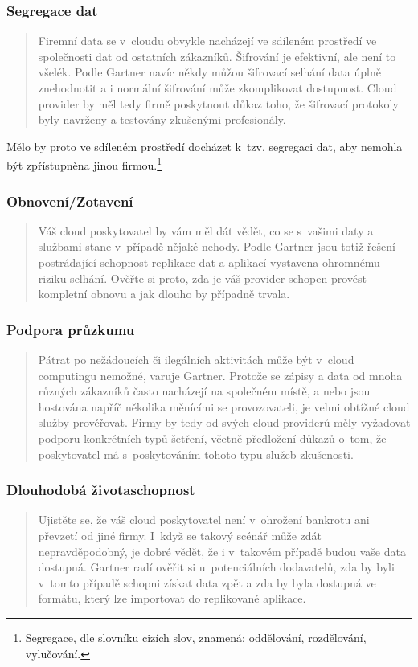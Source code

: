 \subsubsection{Segregace dat}
\begin{quote}
Firemní data se v~cloudu obvykle nacházejí ve sdíleném prostředí ve společnosti dat od ostatních zákazníků. Šifrování je efektivní, ale není to všelék. Podle Gartner navíc někdy můžou šifrovací selhání data úplně znehodnotit a i normální šifrování může zkomplikovat dostupnost. Cloud provider by měl tedy firmě poskytnout důkaz toho, že šifrovací protokoly byly navrženy a testovány zkušenými profesionály.\cite{cloud.cz:7rizik}
\end{quote}
Mělo by proto ve sdíleném prostředí docházet k~tzv. segregaci dat, aby nemohla být zpřístupněna jinou firmou.\footnote{Segregace, dle slovníku cizích slov, znamená: oddělování, rozdělování, vylučování.}

\subsubsection{Obnovení/Zotavení}
\begin{quote}
Váš cloud poskytovatel by vám měl dát vědět, co se s~vašimi daty a službami stane v~případě nějaké nehody. Podle Gartner jsou totiž řešení postrádající schopnost replikace dat a aplikací vystavena ohromnému riziku selhání. Ověřte si proto, zda je váš provider schopen provést kompletní obnovu a jak dlouho by případně trvala.\cite{cloud.cz:7rizik}
\end{quote}

\subsubsection{Podpora průzkumu}
\begin{quote}
Pátrat po nežádoucích či ilegálních aktivitách může být v~cloud computingu nemožné, varuje Gartner. Protože se zápisy a data od mnoha různých zákazníků často nacházejí na společném místě, a nebo jsou hostována napříč několika měnícími se provozovateli, je velmi obtížné cloud služby prověřovat. Firmy by tedy od svých cloud providerů měly vyžadovat podporu konkrétních typů šetření, včetně předložení důkazů o~tom, že poskytovatel má s~poskytováním tohoto typu služeb zkušenosti.\cite{cloud.cz:7rizik}
\end{quote}

\subsubsection{Dlouhodobá životaschopnost}
\begin{quote}
Ujistěte se, že váš cloud poskytovatel není v~ohrožení bankrotu ani převzetí od jiné firmy. I~když se takový scénář může zdát nepravděpodobný, je dobré vědět, že i v~takovém případě budou vaše data dostupná. Gartner radí ověřit si u~potenciálních dodavatelů, zda by byli v~tomto případě schopni získat data zpět a zda by byla dostupná ve formátu, který lze importovat do replikované aplikace.\cite{cloud.cz:7rizik}
\end{quote}

